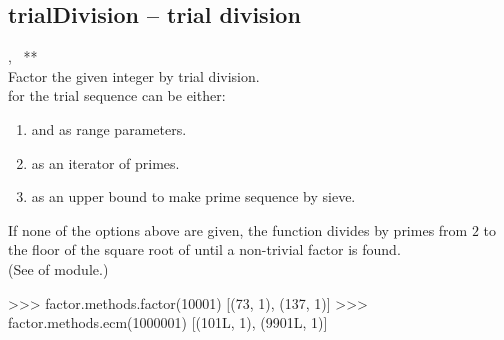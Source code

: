   \subsection{trialDivision -- trial division}
   {%
     ,\ %
     **
   }{%
   }\\
   \spacing
   \quad Factor the given integer  by trial division.\\
   \spacing
   \quad {} for the trial sequence can be either:
   \begin{enumerate}
   \item {} and  as range parameters.
   \item {} as an iterator of primes.
   \item {} as an upper bound to make prime sequence by sieve.
   \end{enumerate}
   If none of the options above are given, the function divides  by primes from \(2\) to the floor of the square root of  until a non-trivial factor is found.\\
   (See  of  module.)\\
%
\begin{ex}
>>> factor.methods.factor(10001)
[(73, 1), (137, 1)]
>>> factor.methods.ecm(1000001)
[(101L, 1), (9901L, 1)]
\end{ex}%
\C



